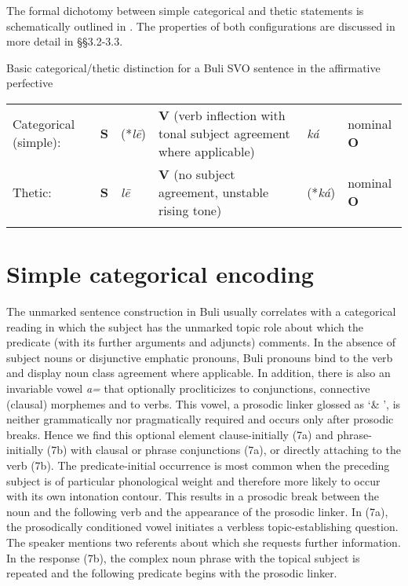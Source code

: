 \documentclass[output=paper]{langsci/langscibook}
\begin{document}
  The formal dichotomy between simple categorical and thetic statements is schematically outlined in . The properties of both configurations are discussed in more detail in §§3.2-3.3.

\begin{stylelsTableHeading}%
\begin{table}
\caption{Basic categorical/thetic distinction for a Buli SVO sentence in the affirmative perfective}
\label{tab:2}
\end{table}\end{stylelsTableHeading}

\begin{tabularx}{\textwidth}{XXXXXX}
\lsptoprule

{\mdseries Categorical (simple):} & {\mdseries \textbf{S}} & {\mdseries (*\textit{l\={e}})} & {\mdseries \textbf{V} (verb inflection with tonal subject agreement where applicable)} & {\mdseries \textit{ká}} & {\mdseries nominal \textbf{O}}\\
{\mdseries Thetic:} & {\mdseries \textbf{S}} & {\mdseries \textit{l\={e}}} & {\mdseries \textbf{V} (no subject agreement, unstable rising tone)} & {\mdseries (*\textit{ká})} & {\mdseries nominal \textbf{O}}\\
\lspbottomrule
\end{tabularx}
\section{Simple categorical encoding}

The unmarked sentence construction in Buli usually correlates with a categorical reading in which the subject has the unmarked topic role about which the predicate (with its further arguments and adjuncts) comments. In the absence of subject nouns or disjunctive emphatic pronouns, Buli pronouns bind to the verb and display noun class agreement where applicable. In addition, there is also an invariable vowel \textit{a=} that optionally procliticizes to conjunctions, connective (clausal) morphemes and to verbs. This vowel, a prosodic linker glossed as ‘\& ’, is neither grammatically nor pragmatically required and occurs only after prosodic breaks. Hence we find this optional element clause-initially (7a) and phrase-initially (7b) with clausal or phrase conjunctions (7a), or directly attaching to the verb (7b). The predicate-initial occurrence is most common when the preceding subject is of particular phonological weight and therefore more likely to occur with its own intonation contour. This results in a prosodic break between the noun and the following verb and the appearance of the prosodic linker. In (7a), the prosodically conditioned vowel initiates a verbless topic-establishing question. The speaker mentions two referents about which she requests further information. In the response (7b), the complex noun phrase with the topical subject is repeated and the following predicate begins with the prosodic linker.  
\end{document}
